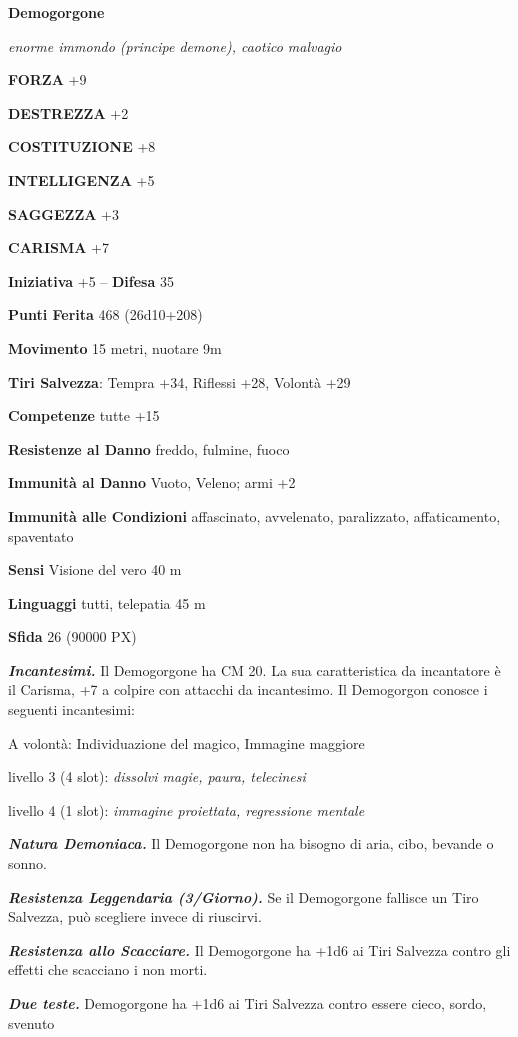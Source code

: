 \begin{multicols}{2}
\medskip{}\textbf{Demogorgone}

\textit{enorme immondo (principe demone), caotico malvagio}

\textbf{FORZA} +9

\textbf{DESTREZZA} +2

\textbf{COSTITUZIONE} +8

\textbf{INTELLIGENZA} +5

\textbf{SAGGEZZA} +3

\textbf{CARISMA} +7

\textbf{Iniziativa} +5 -- \textbf{Difesa} 35

\textbf{Punti Ferita} 468 (26d10+208)

\textbf{Movimento} 15 metri, nuotare 9m

\textbf{Tiri Salvezza}: Tempra +34, Riflessi +28, Volontà +29

\textbf{Competenze} tutte +15

\textbf{Resistenze al Danno} freddo, fulmine, fuoco

\textbf{Immunità al Danno} Vuoto, Veleno; armi +2

\textbf{Immunità alle Condizioni} affascinato, avvelenato, paralizzato, affaticamento, spaventato

\textbf{Sensi} Visione del vero 40 m

\textbf{Linguaggi} tutti, telepatia 45 m

\textbf{Sfida} 26 (90000 PX)

\textit{\textbf{Incantesimi.}} Il Demogorgone ha CM 20. La sua caratteristica da incantatore è il Carisma, +7 a colpire con attacchi da incantesimo. Il Demogorgon conosce i seguenti incantesimi:

A volontà: Individuazione del magico, Immagine maggiore

livello 3 (4 slot): \textit{dissolvi magie, paura, telecinesi}

livello 4 (1 slot): \textit{immagine proiettata, regressione mentale}

\textit{\textbf{Natura Demoniaca.}} Il Demogorgone non ha bisogno di aria, cibo, bevande o sonno.

\textit{\textbf{Resistenza Leggendaria (3/Giorno).}} Se il Demogorgone fallisce un Tiro Salvezza, può scegliere invece di riuscirvi.

\textit{\textbf{Resistenza allo Scacciare.}} Il Demogorgone ha +1d6 ai Tiri Salvezza contro gli effetti che scacciano i non morti.

\textit{\textbf{Due teste.}} Demogorgone ha +1d6 ai Tiri Salvezza contro essere cieco, sordo, svenuto


\end{multicols}
